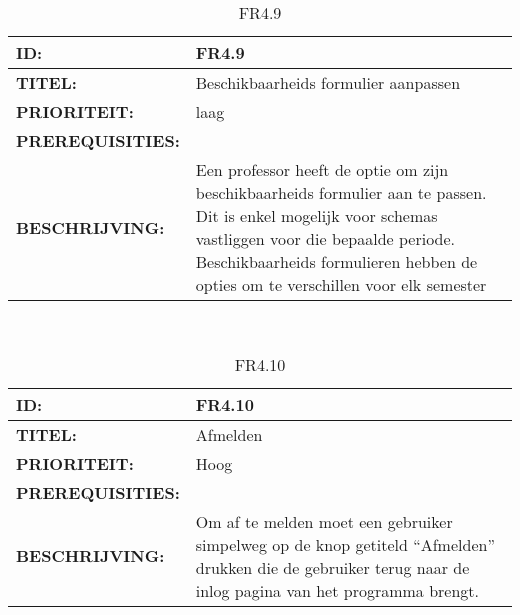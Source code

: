 \noindent\begin{table}[h]
            \begin{tabular}{l | p{10cm}}
                \textbf{ID:} & FR4.9 \\ \hline
                \textbf{TITEL:} & Beschikbaarheids formulier aanpassen \\ \hline
                \textbf{PRIORITEIT:} &  laag \\ \hline
                \textbf{PREREQUISITIES:} & \\ \hline
                \textbf{BESCHRIJVING:} & Een professor heeft de optie om zijn beschikbaarheids formulier aan te passen. Dit is enkel mogelijk voor schemas vastliggen voor die bepaalde periode. Beschikbaarheids formulieren hebben de opties om te verschillen voor elk semester\\ 
            \end{tabular}\\
            \caption{FR4.9}
            \label{tab:myfourteenthtable}
        \end{table}
        
\noindent\begin{table}[h]
            \begin{tabular}{l | p{10cm}}
                \textbf{ID:} & FR4.10 \\ \hline
                \textbf{TITEL:} & Afmelden\\ \hline
                \textbf{PRIORITEIT:} &  Hoog \\ \hline
                \textbf{PREREQUISITIES:} & \\ \hline
                \textbf{BESCHRIJVING:} & Om af te melden moet een gebruiker simpelweg op de knop getiteld “Afmelden” drukken die de gebruiker terug naar de inlog pagina van het programma brengt.\\
            \end{tabular}\\
            \caption{FR4.10}
            \label{tab:mysixteenthtable}
        \end{table}
        
